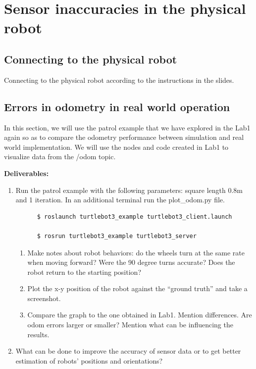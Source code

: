 \documentclass[12pt]{article}
\begin{document}
	\MakeScribeTop



\section {Sensor inaccuracies in the physical robot}
\subsection{Connecting to the physical robot}
Connecting to the physical robot according to the instructions in the slides. 


\subsection{Errors in odometry in real world operation}

In this section, we will use the patrol example that we have explored in the Lab1 again so as to compare the odometry performance between simulation and real world implementation. We will use the nodes and code created in Lab1 to visualize data from the /odom topic.    

\textbf{Deliverables:}
\begin{enumerate}
    

\item Run the patrol example with the following parameters: square length 0.8m and 1 iteration. In an additional terminal run the plot\_odom.py file.
    \begin{verbatim}
      $ roslaunch turtlebot3_example turtlebot3_client.launch
      
      $ rosrun turtlebot3_example turtlebot3_server
    \end{verbatim}

\begin{enumerate}
    \item Make notes about robot behaviors: do the wheels turn at the same rate when moving forward? Were the 90 degree turns accurate? Does the robot return to the starting position?
    \item Plot the x-y position of the robot against the “ground truth” and take a screenshot.
    \item Compare the graph to the one obtained in Lab1. Mention differences. Are odom errors larger or smaller? Mention what can be influencing the results.
    
\end{enumerate}
\item What can be done to improve the accuracy of sensor data or to get better estimation of robots' positions and orientations?


\end{enumerate}
\end{document}
